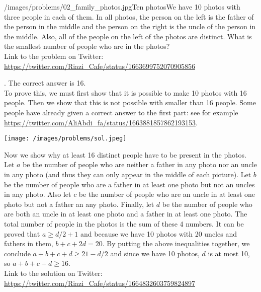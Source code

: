 \begin{problem}{/images/problems/02_family_photos.jpg}{Ten photos}We have 10 photos with three people in each of them. In all photos, the person on the left is the father of the person in the middle and the person on the right is the uncle of the person in the middle. Also, all of the people on the left of the photos are distinct. What is the smallest number of people who are in the photos?\\[0.2cm]

Link to the problem on Twitter:  \url{https://twitter.com/Riazi_Cafe/status/1663699752070905856}\end{problem}
\begin{solution}.
The correct answer is 16. \\[0.2cm]

To prove this, we must first show that it is possible to make 10 photos with 16 people. Then we show that this is not possible with smaller than 16 people. Some people have already given a correct answer to the first part: see for example \url{https://twitter.com/AliAbdi_fa/status/1663881857862193153}.



\begin{center}
	\texttt{[image: /images/problems/sol.jpeg]}
\end{center}	

Now we show why at least 16 distinct people have to be present in the photos. Let $a$ be the number of people who are neither a father in any photo nor an uncle in any photo (and thus they can only appear in the middle of each picture). Let $b$ be the number of people who are a father in at least one photo but not an uncles in any photo. Also let $c$ be the number of people who are an uncle in at least one photo but not a father an any photo. Finally, let $d$ be the number of people who are both an uncle in at least one photo and a father in at least one  photo. The total number of people in the photos is the sum of these 4 numbers. It can be proved that $a \geq d/2 + 1$ and because we have 10 photos with 20 uncles and fathers in them, $b + c + 2d = 20$. By putting the above inequalities together, we conclude $a + b + c + d \geq 21 - d/2$ and since we have 10 photos, $d$ is at most 10, so $a + b + c + d \geq 16$.\\[0.2cm]

Link to the solution on Twitter: \url{https://twitter.com/Riazi_Cafe/status/1664832603759824897}

\end{solution}
